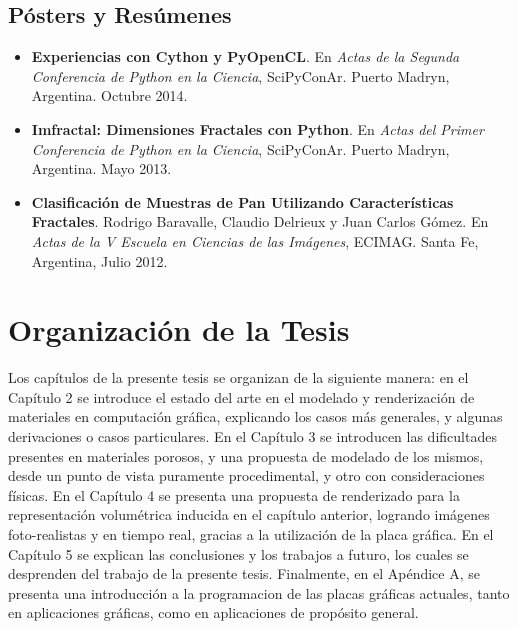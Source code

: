 \subsection*{Pósters y Resúmenes}
\begin{itemize}
\item {\bf Experiencias con Cython y PyOpenCL}. En {\it Actas de la Segunda Conferencia de Python en la Ciencia}, SciPyConAr. Puerto Madryn, Argentina. Octubre 2014.
\item {\bf Imfractal: Dimensiones Fractales con Python}.  En {\it Actas del Primer Conferencia de Python en la Ciencia}, SciPyConAr. Puerto Madryn, Argentina. Mayo 2013.
\item {\bf Clasificación de Muestras de Pan Utilizando Características Fractales}. Rodrigo Baravalle, Claudio Delrieux y Juan Carlos G\'omez. En {\it Actas de la V Escuela en Ciencias de las Imágenes}, ECIMAG. Santa Fe, Argentina, Julio 2012.
\end{itemize}


\section{Organización de la Tesis}
Los capítulos de la presente tesis se organizan de la siguiente manera: en el Capítulo 2 se introduce el estado del arte en el modelado y renderización de materiales en computación gráfica, explicando los casos más generales, y algunas derivaciones o casos particulares.
En el Capítulo 3 se introducen las dificultades presentes en materiales porosos, y una propuesta de modelado de los mismos, desde un punto de vista puramente procedimental, y otro con consideraciones físicas.
En el Capítulo 4 se presenta una propuesta de renderizado para la representación volumétrica inducida en el capítulo anterior, logrando imágenes foto-realistas y en tiempo real, gracias a la utilización de la placa gráfica.
En el Capítulo 5 se explican las conclusiones y los trabajos a futuro, los cuales se desprenden del trabajo de la presente tesis.
Finalmente, en el Apéndice A, se presenta una introducción a la programacion de las placas gráficas actuales, tanto en aplicaciones gráficas, como en aplicaciones de propósito general.
